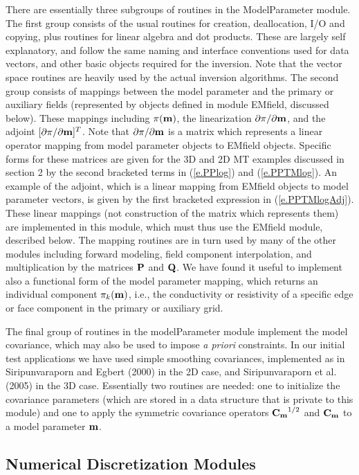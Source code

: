 There are essentially three subgroups of routines in the
ModelParameter module.  The first group consists of
the usual routines for creation, deallocation, I/O and copying,
plus routines for linear algebra and dot products.
These are largely self explanatory, and
follow the same naming and interface conventions used
for data vectors, and other basic objects required for the inversion.
Note that the vector space routines are heavily
used by the actual inversion algorithms.
The second group consists of mappings between the model
parameter and the primary or auxiliary fields
(represented by objects defined
in module EMfield, discussed below).
These mappings including $\pi({\bf m})$,
the linearization $\partial\pi/\partial{\bf m}$,
and the adjoint $[\partial\pi/\partial{\bf m}]^T$.
Note that $\partial\pi/\partial{\bf m}$ is
a matrix which represents a linear operator mapping from
model parameter objects to EMfield objects. 
Specific forms for these matrices are given for the 3D and 2D MT
examples discussed in section 2 by the second bracketed terms
in (\ref{e.PPlog}) and (\ref{e.PPTMlog}).
An example of the adjoint,
which is a linear mapping from EMfield objects to model parameter vectors,
is given by the first bracketed expression in (\ref{e.PPTMlogAdj}).
These linear mappings (not construction of the
matrix which represents them) are implemented in this module,
which must thus use the EMfield module, described below.
The mapping routines are in turn used by many of the other modules
including forward modeling, field component interpolation, 
and multiplication by the matrices ${\bf P}$ and ${\bf Q}$.
We have found it useful to implement
also a functional form of the model parameter mapping, which returns
an individual component $\pi_k({\bf m})$, i.e., the conductivity or resistivity
of a specific edge or face component in the primary or auxiliary grid.

The final group of routines in the modelParameter module implement
the model covariance, which may also be used
to impose {\it a priori} constraints.  
In our initial test applications we have used simple
smoothing covariances, implemented as in
Siripunvaraporn and Egbert (2000) in the 2D case, and 
Siripunvaraporn et al. (2005) in the 3D case.
Essentially two routines are needed: one to initialize
the covariance parameters (which are stored in a data structure
that is private to this module) and one to apply the symmetric covariance
operators ${\bf C_m}^{1/2}$ and ${\bf C_m}$ to a model parameter ${\bf m}$.

\subsection{Numerical Discretization Modules}


